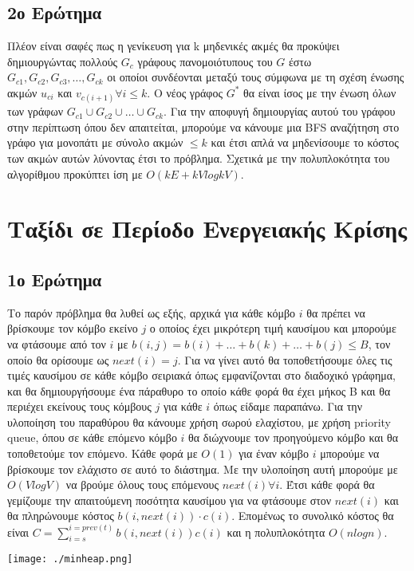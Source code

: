 \documentclass{article}
\begin{document}
\subsection{2ο Ερώτημα}
Πλέον είναι σαφές πως η γενίκευση για k μηδενικές ακμές θα προκύψει δημιουργώντας πολλούς $G_c$ γράφους 
πανομοιότυπους του $G$ έστω $G_{c1},G_{c2},G_{c3},\dots,G_{ck}$ οι οποίοι συνδέονται μεταξύ τους σύμφωνα 
με τη σχέση ένωσης ακμών $u_{ci}$ και $v_{c(i+1)} \forall i \le k$. Ο νέος γράφος $G^*$ θα είναι ίσος 
με την ένωση όλων των γράφων $G_{c1}\cup G_{c2} \cup \dots \cup G_{ck}$. Για την αποφυγή δημιουργίας 
αυτού του γράφου στην περίπτωση όπου δεν απαιτείται, μπορούμε να κάνουμε μια BFS αναζήτηση στο γράφο 
για μονοπάτι με σύνολο ακμών $\le k$ και έτσι απλά να μηδενίσουμε το κόστος των ακμών αυτών λύνοντας 
έτσι το πρόβλημα. Σχετικά με την πολυπλοκότητα του αλγορίθμου προκύπτει ίση με $O(kE+kVlogkV)$.\\


\pagebreak
\section{Ταξίδι σε Περίοδο Ενεργειακής Κρίσης}
\subsection{1ο Ερώτημα}
Το παρόν πρόβλημα θα λυθεί ως εξής, αρχικά για κάθε κόμβο $i$ θα πρέπει να βρίσκουμε τον κόμβο εκείνο 
$j$ ο οποίος έχει μικρότερη τιμή καυσίμου και μπορούμε να φτάσουμε από τον $i$ με $b(i,j) = b(i) + \dots 
+ b(k) + \dots + b(j) \le B$, τον οποίο θα ορίσουμε ως $next(i) = j$. Για να γίνει αυτό θα τοποθετήσουμε όλες
τις τιμές καυσίμου σε κάθε κόμβο σειριακά όπως εμφανίζονται στο διαδοχικό γράφημα, και θα δημιουργήσουμε
ένα πάραθυρο το οποίο κάθε φορά  θα έχει μήκος B και θα περιέχει εκείνους τους κόμβους $j$ για κάθε $i$
όπως είδαμε παραπάνω. Για την υλοποίηση του παραθύρου θα κάνουμε χρήση σωρού ελαχίστου, με χρήση priority 
queue, όπου σε κάθε επόμενο κόμβο $i$ θα διώχνουμε τον προηγούμενο κόμβο και θα τοποθετούμε τον επόμενο.
Κάθε φορά με $O(1)$ για έναν κόμβο $i$ μπορούμε να βρίσκουμε τον ελάχιστο σε αυτό το διάστημα. Με την υλοποίηση
αυτή μπορούμε με $O(VlogV)$ να βρούμε όλους τους επόμενους $next(i) \forall i$. Έτσι κάθε φορά θα γεμίζουμε
την απαιτούμενη ποσότητα καυσίμου για να φτάσουμε στον $next(i)$ και θα πληρώνουμε κόστος $b(i,next(i))\cdot c(i)$.
Επομένως το συνολικό κόστος θα είναι $C = \sum_{i=s}^{i=prev(t)}b(i,next(i))c(i)$ και η πολυπλοκότητα $O(nlogn)$. \\
\begin{center}
    \texttt{[image: ./minheap.png]}
\end{center}
\end{document}
